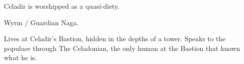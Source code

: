 Celadir is worshipped as a quasi-diety.

Wyrm / Guardian Naga.

Lives at Celadir's Bastion, hidden in the depths of a tower.
Speaks to the populace through The Celadonian, the only human at the Bastion that known what he is.
